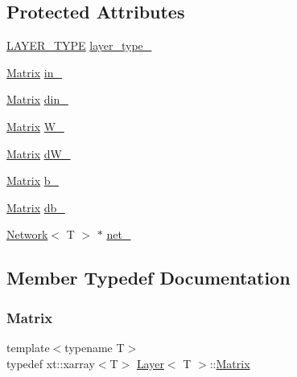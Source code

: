 \subsection*{Protected Attributes}
\begin{DoxyCompactItemize}
\item 
\mbox{\hyperlink{layer__base_8hpp_a5f7e99058765b058df158c099200b154}{L\+A\+Y\+E\+R\+\_\+\+T\+Y\+PE}} \mbox{\hyperlink{class_layer_af60ad69b5833427d6a6a4d49db902d76}{layer\+\_\+type\+\_\+}}
\item 
\mbox{\hyperlink{class_layer_a22b1e7286096aa62bd245536c8ebdaf1}{Matrix}} \mbox{\hyperlink{class_layer_a9482c992e218f5da65c4345be1dd7447}{in\+\_\+}}
\item 
\mbox{\hyperlink{class_layer_a22b1e7286096aa62bd245536c8ebdaf1}{Matrix}} \mbox{\hyperlink{class_layer_adcac12db650e05e0e5c664c304231604}{din\+\_\+}}
\item 
\mbox{\hyperlink{class_layer_a22b1e7286096aa62bd245536c8ebdaf1}{Matrix}} \mbox{\hyperlink{class_layer_a1dd882f1ce286b7d36aa4d14c815b2d3}{W\+\_\+}}
\item 
\mbox{\hyperlink{class_layer_a22b1e7286096aa62bd245536c8ebdaf1}{Matrix}} \mbox{\hyperlink{class_layer_ab02d1e3e853bef3aadffc312ba847f44}{d\+W\+\_\+}}
\item 
\mbox{\hyperlink{class_layer_a22b1e7286096aa62bd245536c8ebdaf1}{Matrix}} \mbox{\hyperlink{class_layer_ab200edbfbb0a0a7ee305d1371feb2815}{b\+\_\+}}
\item 
\mbox{\hyperlink{class_layer_a22b1e7286096aa62bd245536c8ebdaf1}{Matrix}} \mbox{\hyperlink{class_layer_a4ff69fa1c45333cbef24f12d190f26a5}{db\+\_\+}}
\item 
\mbox{\hyperlink{class_network}{Network}}$<$ T $>$ $\ast$ \mbox{\hyperlink{class_layer_a5c55f43a191e4fed38002316ca71b4ff}{net\+\_\+}}
\end{DoxyCompactItemize}


\subsection{Member Typedef Documentation}
\mbox{\label{class_layer_a22b1e7286096aa62bd245536c8ebdaf1}} 
\subsubsection{\texorpdfstring{Matrix}{Matrix}}
{\footnotesize\ttfamily template$<$typename T$>$ \\
typedef xt\+::xarray$<$T$>$ \mbox{\hyperlink{class_layer}{Layer}}$<$ T $>$\+::\mbox{\hyperlink{class_layer_a22b1e7286096aa62bd245536c8ebdaf1}{Matrix}}}

